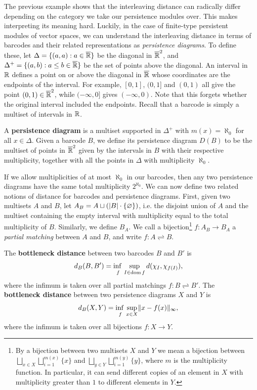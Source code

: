 The previous example shows that the interleaving distance can radically differ depending on the category we take our persistence modules over. This makes interpreting its meaning hard. Luckily, in the case of finite-type persistent modules of vector spaces, we can understand the interleaving distance in terms of barcodes and their related representations as \emph{persistence diagrams}. To define these, let $\Delta = \{ (a,a) : a \in \overline{\mathbb{R}}\}$ be the diagonal in $\overline{\mathbb{R}}^2$, and $\Delta^+ = \{ (a,b) : a \leq b \in \overline{\mathbb{R}}\}$ be the set of points above the diagonal. An interval in $\mathbb{R}$ defines a point on or above the diagonal in $\overline{\mathbb{R}}$ whose coordinates are the endpoints of the interval. For example, $[0,1]$, $(0,1]$ and $(0,1)$ all give the point $(0,1) \in \overline{\mathbb{R}}^2$, while $(-\infty, 0]$ gives $(-\infty, 0)$. Note that this forgets whether the original interval included the endpoints. Recall that a barcode is simply a multiset of intervals in $\mathbb{R}$.
\begin{definition}\label{def:persistence_diagram}
    A \textbf{persistence diagram} is a multiset supported in $\Delta^+$ with $m(x) = \aleph_0$ for all $x \in \Delta$. Given a barcode $B$, we define its persistence diagram $D(B)$ to be the multiset of points in $\overline{\mathbb{R}}^2$ given by the intervals in $B$ with their respective multiplicity, together with all the points in $\Delta$ with multiplicity $\aleph_0$. 
\end{definition}
If we allow multiplicities of at most $\aleph_0$ in our barcodes, then any two persistence diagrams have the same total multiplicity $2^{\aleph_0}$. We can now define two related notions of distance for barcodes and persistence diagrams. First, given two multisets $A$ and $B$, let $A_B = A \sqcup (\lvert B\rvert \cdot \{\varnothing\})$, i.e. the disjoint union of $A$ and the multiset containing the empty interval with multiplicity equal to the total multiplicity of $B$. Similarly, we define $B_A$. We call a bijection\footnote{
    By a bijection between two multisets $X$ and $Y$ we mean a bijection between $\bigsqcup_{x \in X} \bigsqcup_{i=1}^{m(x)} \{x\}$ and $\bigsqcup_{y \in Y} \bigsqcup_{i=1}^{m(y)} \{y\}$, where $m$ is the multiplicity function. In particular, it can send different copies of an element in $X$ with multiplicity greater than $1$ to different elements in $Y$.
} $f : A_B \to B_A$ a \emph{partial matching} between $A$ and $B$, and write $f : A \rightleftharpoons B$.
\begin{definition}\label{def:barcode_bottleneck_distance}
    The \textbf{bottleneck distance} between two barcodes $B$ and $B'$ is
    \[d_B(B, B') = \adjustlimits \inf_{f} \sup_{I \in \dom f} d(\chi_I, \chi_{f(I)}),\]
    where the infimum is taken over all partial matchings $f : B \rightleftharpoons B'$. The \textbf{bottleneck distance} between two persistence diagrams $X$ and $Y$ is
    \[d_B(X,Y) = \adjustlimits \inf_f \sup_{x \in X} \norm{x - f(x)}_\infty,\]
    where the infimum is taken over all bijections $f: X \to Y$.
\end{definition}
